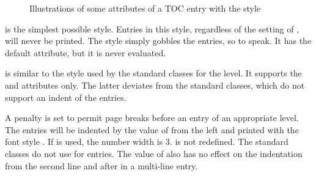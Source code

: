 \begin{description}
\begin{figure}
{%
    }
    \caption{Illustrations of some attributes of a TOC entry with the
       style}
  \end{figure}
\item[\PValue{gobble}] is the simplest possible style. Entries in this style,
  regardless of the setting of %
  ,
  will never be printed. The style simply gobbles the
  entries, so to speak. It has the default  attribute, but
  it is never evaluated.
\item[\PValue{largetocline}] is similar to the style used by the standard
  classes for the  level. It supports the  and
   attributes only. The latter deviates from the standard
  classes, which do not support an indent of the  entries.

  A penalty is set to permit page breaks before an entry of an appropriate
  level. The entries will be indented by the value of  from the
  left and printed with the font style . If
   is used, the number width is 3.
   is not redefined. The standard classes
  do not use  for  entries. The
  value of  also has no effect on the indentation from the
  second line and after in a multi-line entry.


\end{description}
